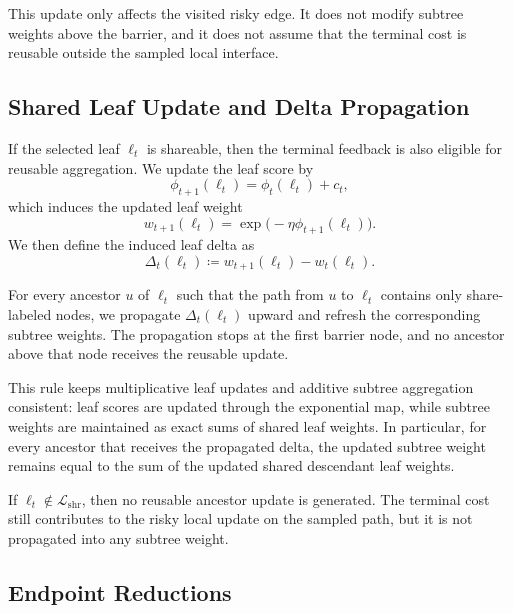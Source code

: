 This update only affects the visited risky edge. It does not modify subtree weights above the barrier, and it does not assume that the terminal cost is reusable outside the sampled local interface.

\subsection{Shared Leaf Update and Delta Propagation}
\label{sec:barriershare_shared_update}

If the selected leaf $\ell_t$ is shareable, then the terminal feedback is also eligible for reusable aggregation. We update the leaf score by
\begin{equation}
    \phi_{t+1}(\ell_t) = \phi_t(\ell_t) + c_t,
    \label{eq:leaf_score_update}
\end{equation}
which induces the updated leaf weight
\begin{equation}
    w_{t+1}(\ell_t) = \exp\!\bigl(-\eta \phi_{t+1}(\ell_t)\bigr).
    \label{eq:leaf_weight_update}
\end{equation}
We then define the induced leaf delta as
\begin{equation}
    \Delta_t(\ell_t) \coloneqq w_{t+1}(\ell_t) - w_t(\ell_t).
    \label{eq:delta_def}
\end{equation}

For every ancestor $u$ of $\ell_t$ such that the path from $u$ to $\ell_t$ contains only share-labeled nodes, we propagate $\Delta_t(\ell_t)$ upward and refresh the corresponding subtree weights. The propagation stops at the first barrier node, and no ancestor above that node receives the reusable update.

This rule keeps multiplicative leaf updates and additive subtree aggregation consistent: leaf scores are updated through the exponential map, while subtree weights are maintained as exact sums of shared leaf weights. In particular, for every ancestor that receives the propagated delta, the updated subtree weight remains equal to the sum of the updated shared descendant leaf weights.

If $\ell_t \notin \mathcal{L}_{\mathrm{shr}}$, then no reusable ancestor update is generated. The terminal cost still contributes to the risky local update on the sampled path, but it is not propagated into any subtree weight.

\subsection{Endpoint Reductions}
\label{sec:barriershare_reductions}

